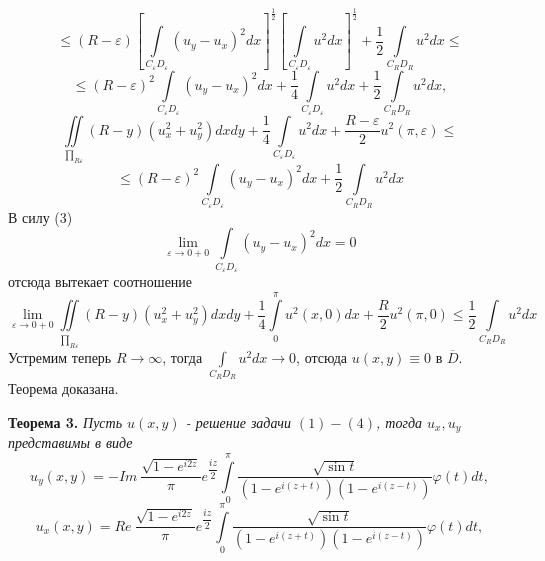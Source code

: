 \documentclass[a4paper, 9pt]{article}
\begin{document}
		\begin{equation*}
			\leq \left(R - \varepsilon\right) \left[\int\limits_{C_\varepsilon D_\varepsilon} \left( u_y - u_x\right)^2 dx \right]^{\frac12} \left[\int\limits_{C_\varepsilon D_\varepsilon} u^2 dx \right]^{\frac12} + \dfrac12 \int\limits_{C_RD_R} u^2 dx \leq
		\end{equation*}
		\begin{equation*}
			\leq \left(R - \varepsilon\right)^2 \int\limits_{C_\varepsilon D_\varepsilon} \left( u_y - u_x\right)^2 dx + \dfrac14 \int\limits_{C_\varepsilon D_\varepsilon} u^2 dx +\dfrac12 \int\limits_{C_RD_R} u^2 dx, 
		\end{equation*}
		\begin{equation*}
			\iint\limits_{\prod_{R\varepsilon}} \left(R - y\right) \left(u_x^2 + u_y^2\right) dx dy + \dfrac{1}{4}\int\limits_{C_\varepsilon D_\varepsilon} u^2 dx +\dfrac{R - \varepsilon}{2}u^2(\pi, \varepsilon) \leq 
		\end{equation*}
		\begin{equation*}
			\leq \left(R - \varepsilon\right)^2 \int\limits_{C_\varepsilon D_\varepsilon} \left( u_y - u_x\right)^2 dx  +\dfrac12 \int\limits_{C_RD_R} u^2 dx
		\end{equation*}
		В силу (3)
		\begin{equation*}
			\lim\limits_{\varepsilon \to 0 + 0} \int\limits_{C_\varepsilon D_\varepsilon} \left(u_y - u_x\right)^2 dx = 0
		\end{equation*}
		отсюда вытекает соотношение
		\begin{equation*}
			\lim\limits_{\varepsilon \to 0 + 0} \iint\limits_{\prod_{R\varepsilon}} \left(R - y\right) \left(u_x^2 + u_y^2 \right) dx dy + \dfrac14 \int\limits_0^\pi u^2(x,0) dx + \dfrac{R}{2}u^2(\pi,0) \leq \dfrac12 \int\limits_{C_RD_R} u^2 dx
		\end{equation*}
		Устремим теперь $R \to \infty$, тогда $\int\limits_{C_RD_R} u^2 dx \to 0$, отсюда $u(x,y) \equiv 0$ в $\overline{D}$. Теорема доказана.
		\par
		\textbf{Теорема 3.} \textit{Пусть $u(x,y)$ - решение задачи $(1)-(4)$, тогда $u_x, u_y$ представимы в виде}
		\begin{equation}
			u_y(x,y) = - Im\  \dfrac{ \sqrt{1 - e^{i2z}} }{\pi} e^{\dfrac{iz}{2}} \int\limits_0^\pi  \dfrac{\sqrt{\sin{t}}}{\left(1 - e^{i(z+t)} \right) \left(1 - e^{i(z-t)}\right)}  \varphi(t) dt, 
		\end{equation}
		\begin{equation}
			u_x(x,y) = Re\   \dfrac{ \sqrt{1 - e^{i2z}} }{\pi} e^{\dfrac{iz}{2}} \int\limits_0^\pi  \dfrac{\sqrt{\sin{t}}}{\left(1 - e^{i(z+t)} \right) \left(1 - e^{i(z-t)}\right)}  \varphi(t) dt,
		\end{equation}
\end{document}
